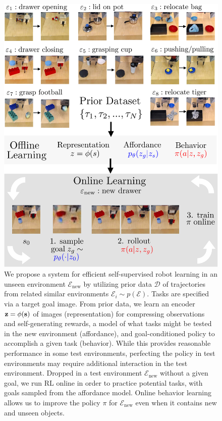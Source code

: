 \begin{figure}
  \includegraphics[width=0.99\linewidth]{val/imgs/fig_page1_v8-crop_compressed.pdf}
  \caption{\small
  We propose a system for efficient self-supervised robot learning in an unseen environment $\mathcal{E}_\text{new}$ by utilizing prior data $\mathcal{D}$ of trajectories from related similar environments $\mathcal{E}_i \sim p(\mathcal{E})$. Tasks are specified via a target goal image. From prior data, we learn an encoder $\mathbf{z} = \phi(\mathbf{s})$ of images (representation) for compressing observations and self-generating rewards, a model of what tasks might be tested in the new environment (affordance), and goal-conditioned policy to accomplish a given task (behavior). While this provides reasonable performance in some test environments, perfecting the policy in test environments may require additional interaction in the test environment. Dropped in a test environment $\mathcal{E}_\text{new}$ without a given goal, we run RL online in order to practice potential tasks, with goals sampled from the affordance model. Online behavior learning allows us to improve the policy $\pi$ for $\mathcal{E}_\text{new}$ even when it contains new and unseen objects. 
  }
  \label{fig:page1}
  \vspace{-0.5cm}
\end{figure}
